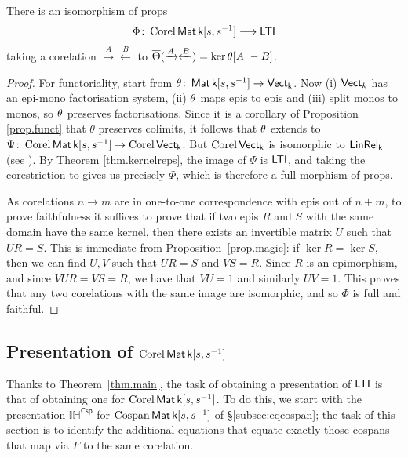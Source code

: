 \begin{theorem}\label{thm.main}
  There is an isomorphism of props 
  \[
    \Phi{\colon} \operatorname{{Corel}}\operatorname{\mathsf{Mat}}{\mathsf{k}[s,s^{-1}]} \longrightarrow \operatorname{\mathsf{LTI}}
  \]
  taking a corelation $\xrightarrow{A}\xleftarrow{B}$ 
  to $\overline{\Theta}(\xrightarrow{A}\xleftarrow{B}) = {\ker\theta [A \ -B]}$.
\end{theorem}
\begin{proof}
  For functoriality, start from $\theta{\colon}\operatorname{\mathsf{Mat}}{\mathsf{k}[s,s^{-1}]} \to
  \operatorname{\mathsf{Vect}}_{\mathsf{k}}$. Now (i) $\operatorname{\mathsf{Vect}}_k$ has an epi-mono factorisation system, (ii)
  $\theta$ maps epis to epis and (iii) split monos to monos, so $\theta$
  preserves factorisations. Since it is a corollary of Proposition \ref{prop.funct}
  that $\theta$ preserves colimits, it follows that $\theta$ extends to
   $\Psi{\colon}\operatorname{{Corel}}\operatorname{\mathsf{Mat}}{\mathsf{k}[s,s^{-1}]} \to \operatorname{{Corel}}\operatorname{\mathsf{Vect}}_{\mathsf{k}}$. But $\operatorname{{Corel}}\operatorname{\mathsf{Vect}}_{\mathsf{k}}$ is
  isomorphic to $\operatorname{\mathsf{LinRel}}_{\mathsf{k}}$ (see %
  \cite{Fo}).
  By Theorem \ref{thm.kernelreps}, the image of $\Psi$ is $\operatorname{\mathsf{LTI}}$, and taking
  the corestriction to gives us precisely $\Phi$, which is therefore a full
  morphism of props.

  As corelations $n \to m$ are in one-to-one correspondence with epis out of
  $n+m$, to prove faithfulness it suffices to prove that if two epis $R$ and $S$
  with the same domain have the same kernel, then there exists an invertible
  matrix $U$ such that $UR =S$. This is immediate from
  Proposition~\ref{prop.magic}: if $\ker R= \ker S$, then we can find $U, V$
  such that $UR = S$ and $VS = R$. Since $R$ is an epimorphism, and since $VUR =
  VS = R$, we have that $VU=1$ and similarly $UV =1$. This proves that any two
  corelations with the same image are isomorphic, and so $\Phi$ is full and
  faithful.  
\end{proof}


\subsection{Presentation of $\operatorname{{Corel}}\operatorname{\mathsf{Mat}}{\mathsf{k}[s,s^{-1}]}$}


Thanks to Theorem~\ref{thm.main}, the task of obtaining a presentation of $\operatorname{\mathsf{LTI}}$
is that of obtaining one for $\operatorname{{Corel}}\operatorname{\mathsf{Mat}}{\mathsf{k}[s,s^{-1}]}$. 
%
To do this, we start with the presentation
$\mathbb{IH}^{\textsf{Csp}}$ for $\operatorname{{Cospan}}\operatorname{\mathsf{Mat}}{\mathsf{k}[s,s^{-1}]}$ of \S\ref{subsec:eqcospan}; the task of
this section is to identify the additional equations that equate
exactly those cospans that map via $F$ to the same corelation.

